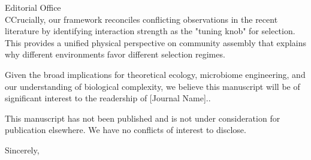 \documentclass[11pt]{letter}
\begin{document}
\begin{letter}{Editorial Office \\ [Journal Name]}
CCrucially, our framework reconciles conflicting observations in the recent literature by identifying interaction strength as the "tuning knob" for selection. This provides a unified physical perspective on community assembly that explains why different environments favor different selection regimes.

Given the broad implications for theoretical ecology, microbiome engineering, and our understanding of biological complexity, we believe this manuscript will be of significant interest to the readership of [Journal Name]..

This manuscript has not been published and is not under consideration for publication elsewhere. We have no conflicts of interest to disclose.

\closing{Sincerely,}

\end{letter}
\end{document}
